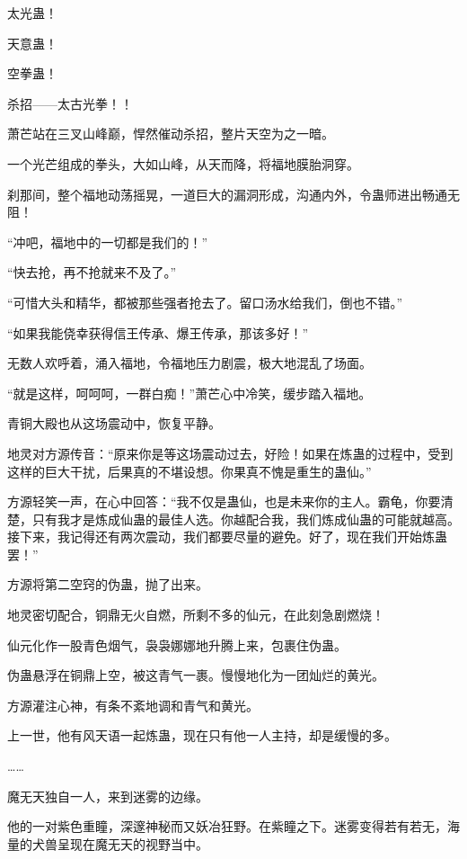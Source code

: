 
\begin{this_body}



太光蛊！

天意蛊！

空拳蛊！

杀招——太古光拳！！

萧芒站在三叉山峰巅，悍然催动杀招，整片天空为之一暗。

一个光芒组成的拳头，大如山峰，从天而降，将福地膜胎洞穿。

刹那间，整个福地动荡摇晃，一道巨大的漏洞形成，沟通内外，令蛊师进出畅通无阻！

“冲吧，福地中的一切都是我们的！”

“快去抢，再不抢就来不及了。”

“可惜大头和精华，都被那些强者抢去了。留口汤水给我们，倒也不错。”

“如果我能侥幸获得信王传承、爆王传承，那该多好！”

无数人欢呼着，涌入福地，令福地压力剧震，极大地混乱了场面。

“就是这样，呵呵呵，一群白痴！”萧芒心中冷笑，缓步踏入福地。

青铜大殿也从这场震动中，恢复平静。

地灵对方源传音：“原来你是等这场震动过去，好险！如果在炼蛊的过程中，受到这样的巨大干扰，后果真的不堪设想。你果真不愧是重生的蛊仙。”

方源轻笑一声，在心中回答：“我不仅是蛊仙，也是未来你的主人。霸龟，你要清楚，只有我才是炼成仙蛊的最佳人选。你越配合我，我们炼成仙蛊的可能就越高。接下来，我记得还有两次震动，我们都要尽量的避免。好了，现在我们开始炼蛊罢！”

方源将第二空窍的伪蛊，抛了出来。

地灵密切配合，铜鼎无火自燃，所剩不多的仙元，在此刻急剧燃烧！

仙元化作一股青色烟气，袅袅娜娜地升腾上来，包裹住伪蛊。

伪蛊悬浮在铜鼎上空，被这青气一裹。慢慢地化为一团灿烂的黄光。

方源灌注心神，有条不紊地调和青气和黄光。

上一世，他有风天语一起炼蛊，现在只有他一人主持，却是缓慢的多。

……

魔无天独自一人，来到迷雾的边缘。

他的一对紫色重瞳，深邃神秘而又妖冶狂野。在紫瞳之下。迷雾变得若有若无，海量的犬兽呈现在魔无天的视野当中。


\end{this_body}
